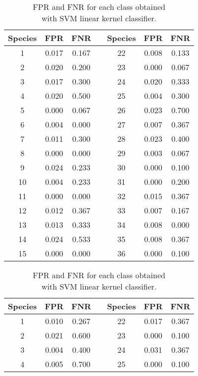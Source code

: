 \documentclass{article}
\begin{document}
\begin{table}[h]
\begin{minipage}[]{7cm}
 \begin{adjustwidth}{-3cm}{}
\begin{tabular}{|c|c|c|c|c|c|c| } \hline
Species & FPR & FNR & & Species & FPR & FNR \\
\hline
1 & 0.017 & 0.167 & & 22 & 0.008 & 0.133 \\ 
\hline
2 & 0.020 & 0.200 & & 23 & 0.000 & 0.067 \\ 
\hline
 3 & 0.017 & 0.300 & & 24 & 0.020 & 0.333\\ 
\hline
 4 & 0.020 & 0.500 & & 25 & 0.004 & 0.300 \\ 
\hline
 5 & 0.000 & 0.067 & & 26 & 0.023 & 0.700 \\ 
\hline
 6 & 0.004 & 0.000 & & 27 & 0.007 & 0.367 \\ 
\hline
 7 & 0.011 & 0.300 & & 28 & 0.023 & 0.400 \\ 
\hline
 8 & 0.000 & 0.000 & & 29 & 0.003 & 0.067 \\ 
\hline
 9 & 0.024 & 0.233 & & 30 & 0.000 & 0.100  \\ 
\hline
 10 & 0.004 & 0.233 & & 31 &  0.000 & 0.200 \\ 
\hline
 11 & 0.000 & 0.000 & & 32 & 0.015 & 0.367 \\ 
\hline
 12 & 0.012 & 0.367 & & 33 & 0.007 & 0.167\\ 
\hline
 13 & 0.013 & 0.333 & & 34 & 0.008 & 0.000\\ 
\hline
 14 & 0.024 & 0.533 & & 35 & 0.008 & 0.367\\ 
\hline
 15 & 0.000 & 0.000 & & 36 & 0.000 & 0.100\\  
\hline
\end{tabular}
\caption{FPR and FNR for each class obtained \\ with SVM linear kernel classifier.}\label{table3}
\end{adjustwidth}
\end{minipage}
\hfill
\begin{minipage}[]{7cm}
\begin{tabular}{ |c|c|c|c|c|c|c| } \hline
Species & FPR & FNR & & Species & FPR & FNR \\
\hline
1 & 0.010 & 0.267 & & 22 & 0.017 & 0.367 \\ 
\hline
2 & 0.021 & 0.600 & & 23 & 0.000 & 0.100\\ 
\hline
 3 & 0.004 & 0.400 & & 24 & 0.031 & 0.367 \\ 
\hline
 4 & 0.005 & 0.700 & & 25 & 0.000 & 0.100\\ 

\end{tabular}
\end{minipage}
\end{table}
\end{document}
